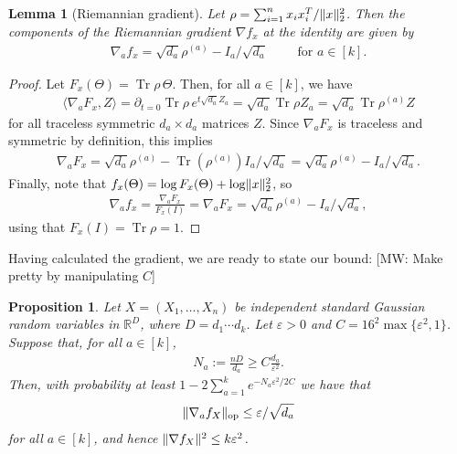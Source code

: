 \documentclass{article}
\newtheorem{prop}[theorem]{Proposition}
\newtheorem{lemma}[theorem]{Lemma}
\DeclarePairedDelimiter{\norm}{\lVert}{\rVert}
\newcommand{\R}{{\mathbb{R}}}
\newcommand{\op}{\operatorname{op}}
\newcommand\eps{\varepsilon}
\newcommand\samp{x}
\newcommand\rv{X}
\newcommand\tr{\operatorname{Tr}}
\newcommand{\MW}[1]{{\color{red}[MW: #1]}}
\begin{document}
\begin{lemma}[Riemannian gradient]\label{lem:gradient}
Let $\rho = \sum_{i=1}^n \samp_i \samp_i^T / \norm{\samp}_2^2$.
Then the components of the Riemannian gradient $\nabla f_{\samp}$ at the identity are given by
\begin{align*}
  \nabla_a f_{\samp} = \sqrt{d_a} \rho^{(a)} - I_a/\sqrt{d_a} \qquad \text{ for } a \in [k].
\end{align*}
\end{lemma}
\begin{proof}
  Let $F_{\samp}(\Theta) = \tr \rho \, \Theta$.
  Then, for all $a\in[k]$, we have
  \begin{align*}
   \langle \nabla_a F_{\samp} , Z \rangle
  = \partial_{t=0} \tr \rho \, e^{t \sqrt{d_a} Z_a}
  = \sqrt{d_a} \tr \rho Z_a
  = \sqrt{d_a} \tr \rho^{(a)} Z
  \end{align*}
  for all traceless symmetric $d_a \times d_a$ matrices $Z$.
  Since $\nabla_a F_{\samp}$ is traceless and symmetric by definition, this implies
  \begin{align*}
    \nabla_a F_{\samp}
  = \sqrt{d_a} \rho^{(a)} - \tr(\rho^{(a)}) I_a /\sqrt{d_a}
  = \sqrt{d_a} \rho^{(a)} - I_a/\sqrt{d_a}.
  \end{align*}
  Finally, note that $f_{\samp}(\Theta) = \log F_{\samp}(\Theta) + \log \norm{\samp}_2^2$, so
  \begin{align*}
    \nabla_a f_{\samp}
  = \frac{\nabla_a F_{\samp}}{F_{\samp}(I)}
  = \nabla_a F_{\samp}
  = \sqrt{d_a} \rho^{(a)} - I_a/\sqrt{d_a},
  \end{align*}
  using that $F_{\samp}(I) = \tr \rho = 1$.
\end{proof}

Having calculated the gradient, we are ready to state our bound:
\MW{Make pretty by manipulating $C$}
\begin{prop}\label{prop:gradient-bound}
Let $\rv = (\rv_1,\dots,\rv_n)$ be independent standard Gaussian random variables in $\R^D$, where $D=d_1\cdots{}d_k$.
Let $\eps>0$ and $C = 16^2\max\{\eps^2,1\}$.
Suppose that, for all $a \in [k]$,
\begin{align*}
  N_a := \frac{n D}{d_a} \geq C \frac{d_a}{\eps^2}.
\end{align*}
Then, with probability at least $1 - 2 \sum_{a=1}^k e^{-N_a \eps^2/2C}$ we have that
\begin{align*}
  \norm{\nabla_a f_{\rv}}_{\op} \leq \eps/\sqrt{d_a}
\end{align*}
for all $a\in[k]$, and hence $\norm{\nabla f_{\rv}}^2 \leq k \eps^2$.
\end{prop}
\end{document}
